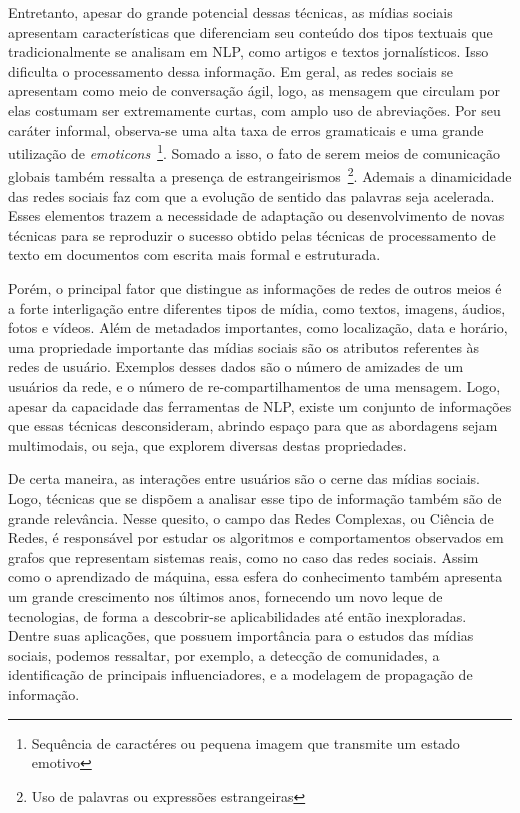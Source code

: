 Entretanto, apesar do grande potencial dessas técnicas, as mídias sociais
apresentam características que diferenciam seu conteúdo dos tipos textuais que
tradicionalmente se analisam em NLP, como artigos e textos jornalísticos.
Isso dificulta o processamento dessa informação.
Em geral, as redes sociais se apresentam como meio de conversação ágil, logo,
as mensagem que circulam por elas costumam ser extremamente curtas, com amplo
uso de abreviações.
Por seu caráter informal, observa-se uma alta taxa de erros gramaticais e
uma grande utilização de \textit{emoticons}~\footnote{Sequência de caractéres ou
pequena imagem que transmite um estado emotivo}.
Somado a isso, o fato de serem meios de comunicação globais também ressalta a
presença de estrangeirismos~\footnote{Uso de palavras ou expressões estrangeiras}.
Ademais a dinamicidade das redes sociais faz com que a evolução de sentido das
palavras seja acelerada.
Esses elementos trazem a necessidade de adaptação ou desenvolvimento de novas
técnicas para se reproduzir o sucesso obtido pelas técnicas de processamento de
texto em documentos com escrita mais formal e estruturada.

Porém, o principal fator que distingue as informações de redes de outros meios é
a forte interligação entre diferentes tipos de mídia, como textos, imagens,
áudios, fotos e vídeos.
Além de metadados importantes, como localização, data e horário, uma propriedade
importante das mídias sociais são os atributos referentes às redes de usuário.
Exemplos desses dados são o número de amizades de um usuários da rede, e o
número de re-compartilhamentos de uma mensagem.
Logo, apesar da capacidade das ferramentas de NLP, existe um conjunto de
informações que essas técnicas desconsideram, abrindo espaço para que as
abordagens sejam multimodais, ou seja, que explorem diversas destas
propriedades.

De certa maneira, as interações entre usuários são o cerne das mídias sociais.
Logo, técnicas que se dispõem a analisar esse tipo de informação também são de
grande relevância.
Nesse quesito, o campo das Redes Complexas, ou Ciência de Redes, é responsável
por estudar os algoritmos e comportamentos observados em grafos que representam
sistemas reais, como no caso das redes sociais.
Assim como o aprendizado de máquina, essa esfera do conhecimento também
apresenta um grande crescimento nos últimos anos, fornecendo um novo leque de
tecnologias, de forma a descobrir-se aplicabilidades até então inexploradas.
Dentre suas aplicações, que possuem importância para o estudos das mídias
sociais, podemos ressaltar, por exemplo, a detecção de comunidades, a
identificação de principais influenciadores, e a modelagem de propagação de
informação.

